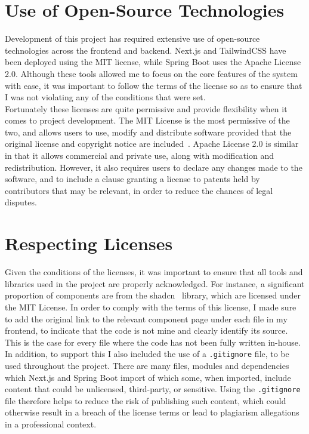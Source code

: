 \documentclass[]{final_report}
\begin{document}
\section{Use of Open-Source Technologies}

Development of this project has required extensive use of open-source technologies across the frontend and backend. Next.js and TailwindCSS have been deployed using the MIT license, while Spring Boot uses the Apache License 2.0. Although these tools allowed me to focus on the core features of the system with ease, it was important to follow the terms of the license so as to ensure that I was not violating any of the conditions that were set.\\

Fortunately these licenses are quite permissive and provide flexibility when it comes to project development. The MIT License is the most permissive of the two, and allows users to use, modify and distribute software provided that the original license and copyright notice are included~\cite{MIT_LICENSE}. Apache License 2.0 is similar in that it allows commercial and private use, along with modification and redistribution. However, it also requires users to declare any changes made to the software, and to include a clause granting a license to patents held by contributors that may be relevant, in order to reduce the chances of legal disputes.

\section{Respecting Licenses}

Given the conditions of the licenses, it was important to ensure that all tools and libraries used in the project are properly acknowledged. For instance, a significant proportion of components are from the shadcn~\cite{SHADCN} library, which are licensed under the MIT License. In order to comply with the terms of this license, I made sure to add the original link to the relevant component page under each file in my frontend, to indicate that the code is not mine and clearly identify its source. This is the case for every file where the code has not been fully written in-house.\\

In addition, to support this I also included the use of a \verb|.gitignore| file, to be used throughout the project. There are many files, modules and dependencies which Next.js and Spring Boot import of which some, when imported, include content that could be unlicensed, third-party, or sensitive. Using the \verb|.gitignore| file therefore helps to reduce the risk of publishing such content, which could otherwise result in a breach of the license terms or lead to plagiarism allegations in a professional context.
\end{document}
